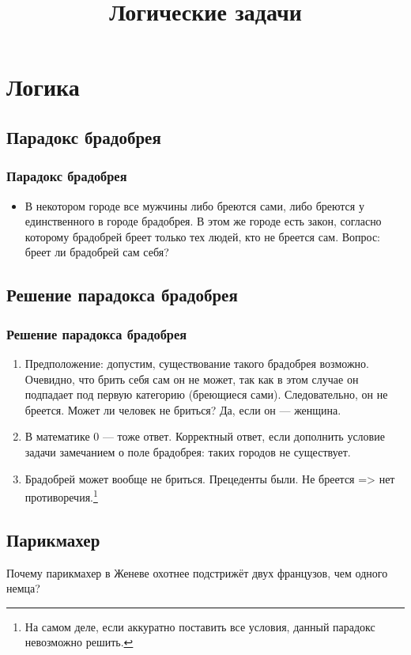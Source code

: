\documentclass[compress,red]{beamer}
\title{Логические задачи}
\begin{document}
\maketitle

\section{Логика}

\subsection{Парадокс брадобрея}
\begin{frame}[fragile]
  \frametitle{Парадокс брадобрея}
  \begin{itemize}
    \item В некотором городе все мужчины либо бреются сами, либо бреются у единственного в городе брадобрея. В этом же городе есть закон, согласно которому брадобрей бреет только тех людей, кто не бреется сам. Вопрос: бреет ли брадобрей сам себя?
  \end{itemize}
\end{frame}

\subsection{Решение парадокса брадобрея}
\begin{frame}[fragile]
  \frametitle{Решение парадокса брадобрея}
  \begin{enumerate}
    \item Предположение: допустим, существование такого брадобрея возможно. Очевидно, что брить себя сам он не может, так как в этом случае он подпадает под первую категорию (бреющиеся сами). Следовательно, он не бреется. Может ли человек не бриться? Да, если он --- женщина.
    \item В математике 0 --- тоже ответ. Корректный ответ, если дополнить условие задачи замечанием о поле брадобрея: таких городов не существует.
    \item Брадобрей может вообще не бриться. Прецеденты были. Не бреется => нет противоречия.\footnote{На самом деле, если аккуратно поставить все условия, данный парадокс невозможно решить.}
  \end{enumerate}
\end{frame}

\subsection{Парикмахер}
\begin{frame}
  \begin{center}
    \Large{Почему парикмахер в Женеве охотнее подстрижёт двух французов, чем одного немца?}
  \end{center}
\end{frame}
\end{document}
